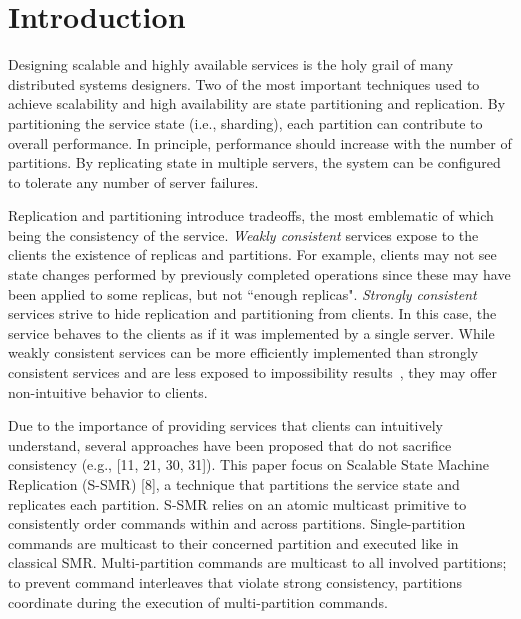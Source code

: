 \section{Introduction}

Designing scalable and highly available services is the holy grail of many distributed systems designers.
Two of the most important techniques used to achieve scalability and high availability are state partitioning and replication.
By partitioning the service state (i.e., sharding), each partition can contribute to overall performance.
In principle, performance should increase with the number of partitions.
By replicating state in multiple servers, the system can be configured to tolerate any number of server failures.

Replication and partitioning introduce tradeoffs, the most emblematic of which being the consistency of the service.
\emph{Weakly consistent} services expose to the clients the existence of replicas and partitions.
For example, clients may not see state changes performed by previously completed operations since these may have been applied to some replicas, but not ``enough replicas". 
\emph{Strongly consistent} services strive to hide replication and partitioning from clients.
In this case, the service behaves to the clients as if it was implemented by a single server.
While weakly consistent services can be more efficiently implemented than strongly consistent services and are less exposed to impossibility results~\cite{FLP85,Gilbert:2002},
they may offer non-intuitive behavior to clients.

Due to the importance of providing services that clients can intuitively understand, several approaches have been proposed that do not sacrifice consistency (e.g., [11, 21, 30, 31]).
This paper focus on Scalable State Machine Replication (S-SMR) [8], a technique that partitions the service state and replicates each partition.
S-SMR relies on an atomic multicast primitive to consistently order commands within and across partitions. 
Single-partition commands are multicast to their concerned partition and executed like in classical SMR. 
Multi-partition commands are multicast to all involved partitions; to prevent command interleaves that violate strong consistency, partitions coordinate during the execution of multi-partition commands.

